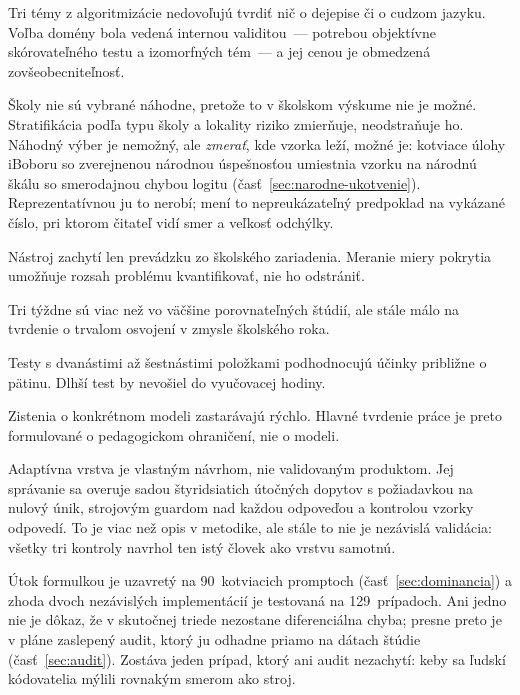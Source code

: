 \begin{description}[leftmargin=0.6cm, nosep]
    \item[\textbf{Jediná doména.}] Tri témy z algoritmizácie nedovoľujú tvrdiť nič o dejepise či o cudzom jazyku. Voľba domény bola vedená internou validitou~--- potrebou objektívne skórovateľného testu a izomorfných tém~--- a jej cenou je obmedzená zovšeobecniteľnosť.
    \item[\textbf{Zámerný výber škôl.}] Školy nie sú vybrané náhodne, pretože to v školskom výskume nie je možné. Stratifikácia podľa typu školy a lokality riziko zmierňuje, neodstraňuje ho. Náhodný výber je nemožný, ale \emph{zmerať}, kde vzorka leží, možné je: kotviace úlohy iBoboru so zverejnenou národnou úspešnosťou umiestnia vzorku na národnú škálu so smerodajnou chybou \nanSe{} logitu (časť~\ref{sec:narodne-ukotvenie}). Reprezentatívnou ju to nerobí; mení to nepreukázateľný predpoklad na vykázané číslo, pri ktorom čitateľ vidí smer a veľkosť odchýlky.
    \item[\textbf{Neviditeľné použitie.}] Nástroj zachytí len prevádzku zo školského zariadenia. Meranie miery pokrytia umožňuje rozsah problému kvantifikovať, nie ho odstrániť.
    \item[\textbf{Krátky odstup.}] Tri týždne sú viac než vo väčšine porovnateľných štúdií, ale stále málo na tvrdenie o trvalom osvojení v zmysle školského roka.
    \item[\textbf{Útlm chybou merania.}] Testy s dvanástimi až šestnástimi položkami podhodnocujú účinky približne o pätinu. Dlhší test by nevošiel do vyučovacej hodiny.
    \item[\textbf{Jedna verzia modelu.}] Zistenia o konkrétnom modeli zastarávajú rýchlo. Hlavné tvrdenie práce je preto formulované o pedagogickom ohraničení, nie o modeli.
    \item[\textbf{Neoverená pedagogická vrstva.}] Adaptívna vrstva je vlastným návrhom, nie validovaným produktom. Jej správanie sa overuje sadou štyridsiatich útočných dopytov s požiadavkou na nulový únik, strojovým guardom nad každou odpoveďou a kontrolou vzorky odpovedí. To je viac než opis v metodike, ale stále to nie je nezávislá validácia: všetky tri kontroly navrhol ten istý človek ako vrstvu samotnú.
    \item[\textbf{Klasifikátor je kalibrovaný na kotviacom súbore, nie na triede.}] Útok formulkou je uzavretý na 90~kotviacich promptoch (časť~\ref{sec:dominancia}) a zhoda dvoch nezávislých implementácií je testovaná na 129~prípadoch. Ani jedno nie je dôkaz, že v skutočnej triede nezostane diferenciálna chyba; presne preto je v pláne zaslepený audit, ktorý ju odhadne priamo na dátach štúdie (časť~\ref{sec:audit}). Zostáva jeden prípad, ktorý ani audit nezachytí: keby sa ľudskí kódovatelia mýlili rovnakým smerom ako stroj.

\end{description}

